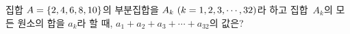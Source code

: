 집합 $A=\{2{,}\mkern3mu\mathopen{}4{,}\mkern3mu\mathopen{}6{,}\mkern3mu\mathopen{}8{,}\mkern3mu\mathopen{}10\}$의 부분집합을 $A_k\ (k=1{,}\mkern3mu\mathopen{}2{,}\mkern3mu\mathopen{}3{,}\mkern3mu\mathopen{}\cdots{,}\mkern3mu\mathopen{}32)$라 하고 집합~$A_k$의 모든 원소의 합을 $a_k$라 할 때, $a_1+a_2+a_3+\cdots+a_{32}$의 값은?
